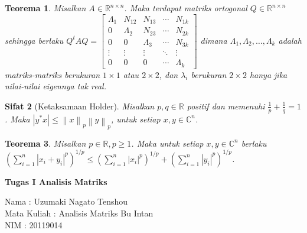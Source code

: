 \documentclass[11pt,a4paper]{article}
\newcommand{\ds}{\displaystyle}
\theoremstyle{plain}
\newtheorem{theorem}{Teorema}[section]
\newtheorem{sifat}[theorem]{Sifat}
\theoremstyle{definition}
\theoremstyle{remark}
\begin{document}
\begin{enumerate}
	\begin{bfseries}
		\begin{theorem}
			Misalkan $A\in \mathbb{R}^{n\times n}$. Maka terdapat matriks ortogonal $Q\in \mathbb{R}^{n\times n}$ sehingga berlaku $Q^{t}AQ = \begin{bmatrix}
			\Lambda_{1} & N_{12} & N_{13} & \cdots & N_{1k} \\
			0 & \Lambda_{2} & N_{23} & \cdots & N_{2k} \\
			0 & 0 & \Lambda_{3} & \cdots & N_{3k} \\
			\vdots & \vdots & \vdots &\ddots & \vdots \\
			0 & 0 & 0 & \cdots & \Lambda_{k}	
			\end{bmatrix}$ dimana $\Lambda_{1},\Lambda_{2},\ldots,\Lambda_{k}$ adalah matriks-matriks berukuran $1\times 1$ atau $2\times 2$, dan $\lambda_{i}$ berukuran $2\times 2$ hanya jika nilai-nilai eigennya tak real.
		\end{theorem}
	\end{bfseries}

	\begin{bfseries}
		\begin{sifat}[Ketaksamaan Holder]
			Misalkan $p,q\in \mathbb{R}$ positif dan memenuhi $\ds \frac{1}{p}+\frac{1}{q}=1$. Maka $\left| y^{\ast}x \right|\leq \left\| x \right\|_{p} \left\| y\right\|_{p}$, untuk setiap $x,y\in \mathbb{C}^{n}$. 
		\end{sifat}
	\end{bfseries}

	\begin{bfseries}
		\begin{theorem}
			Misalkan $p\in \mathbb{R}, p\geq 1$. Maka untuk setiap $x,y\in \mathbb{C}^{n}$ berlaku $\ds \left(\sum_{i=1}^{n} \left| x_{i}+y_{i} \right|^{p} \right)^{1/p} \leq \left(\sum_{i=1}^{n} \left| x_{i} \right|^{p} \right)^{1/p} + \left(\sum_{i=1}^{n} \left| y_{i} \right|^{p} \right)^{1/p}$.
		\end{theorem}
	\end{bfseries}






	\newpage 
	
	\begin{center}
		\textbf{Tugas I Analisis Matriks}
	\end{center}
	
	
	Nama : Uzumaki Nagato Tenshou\\
	Mata Kuliah : Analisis Matriks Bu Intan\\
	NIM : 20119014\\
	

\end{enumerate}
\end{document}
